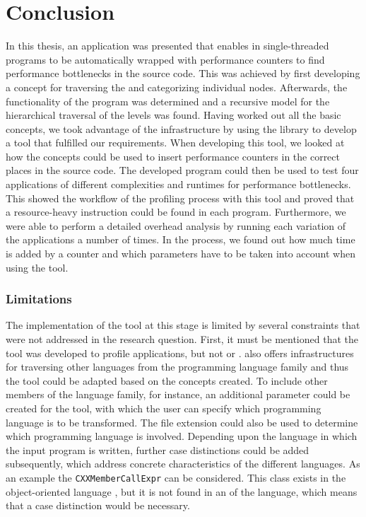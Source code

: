 \chapter{Conclusion}
\label{chapter6}
In this thesis, an application was presented that enables \roismall in single-threaded \CPP programs to be automatically wrapped with performance counters to find performance bottlenecks in the source code. This was achieved by first developing a concept for traversing the \CLANG \astsmall and categorizing individual nodes. Afterwards, the functionality of the program was determined and a recursive model for the hierarchical traversal of the levels was found. Having worked out all the basic concepts, we took advantage of the \CLANG infrastructure by using the \LIBTOOLING library to develop a \CLANG tool that fulfilled our requirements. When developing this tool, we looked at how the concepts could be used to insert performance counters in the correct places in the source code. The developed program could then be used to test four applications of different complexities and runtimes for performance bottlenecks. This showed the workflow of the profiling process with this tool and proved that a resource-heavy instruction could be found in each program. Furthermore, we were able to perform a detailed overhead analysis by running each variation of the applications a number of times. In the process, we found out how much time is added by a counter and which parameters have to be taken into account when using the tool. 

\subsection{Limitations}
The implementation of the tool at this stage is limited by several constraints that were not addressed in the research question. First, it must be mentioned that the tool was developed to profile \CPP applications, but not \C or \OC. \CLANG also offers infrastructures for traversing other languages from the \C programming language family and thus the tool could be adapted based on the concepts created. To include other members of the \C language family, for instance, an additional parameter could be created for the tool, with which the user can specify which programming language is to be transformed. The file extension could also be used to determine which programming language is involved. Depending upon the language in which the input program is written, further case distinctions could be added subsequently, which address concrete characteristics of the different languages. As an example the \lstinline{CXXMemberCallExpr} can be considered. This class exists in the object-oriented language \CPP, but it is not found in an \astsmall of the \C language, which means that a case distinction would be necessary.

